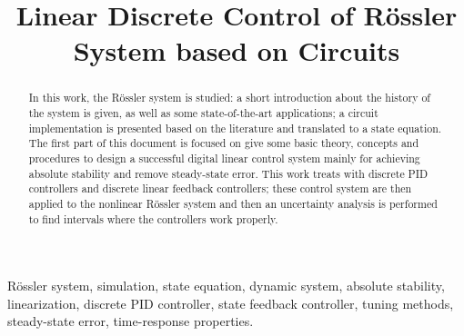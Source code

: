 \documentclass[conference]{IEEEtran}
\begin{document}
\title{Linear Discrete Control of Rössler System based on Circuits\\}

\author{
\and
{}
}

\maketitle

\begin{abstract}
In this work, the Rössler system is studied: a short introduction about the history of the system is given, as well as some state-of-the-art applications; a circuit implementation is presented based on the literature and translated to a state equation. The first part of this document is focused on give some basic theory, concepts and procedures to design a successful digital linear control system mainly for achieving absolute stability and remove steady-state error. This work treats with discrete PID controllers and discrete linear feedback controllers; these control system are then applied to the nonlinear Rössler system and then an uncertainty analysis is performed to find intervals where the controllers work properly.
\end{abstract}

\begin{IEEEkeywords}
Rössler system, simulation, state equation, dynamic system, absolute stability, linearization, discrete PID controller, state feedback controller, tuning methods, steady-state error, time-response properties.
\end{IEEEkeywords}





\nocite{*}


\end{document}
